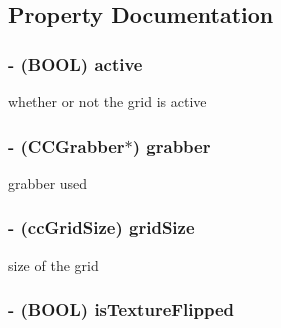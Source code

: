 \subsection{Property Documentation}
\hypertarget{interface_c_c_grid_base_a1ff789adfb6e068f9bdc460c70916035}{
\subsubsection[{active}]{\setlength{\rightskip}{0pt plus 5cm}-\/ (B\-O\-O\-L) {\bf active}}}\label{interface_c_c_grid_base_a1ff789adfb6e068f9bdc460c70916035}
whether or not the grid is active \hypertarget{interface_c_c_grid_base_a9947ff1cac4cf470351da177fc1c4a19}{
\subsubsection[{grabber}]{\setlength{\rightskip}{0pt plus 5cm}-\/ ({\bf C\-C\-Grabber}$\ast$) {\bf grabber}}}\label{interface_c_c_grid_base_a9947ff1cac4cf470351da177fc1c4a19}
grabber used \hypertarget{interface_c_c_grid_base_a3b115a5e6c8321f599ca3693dc20f62c}{
\subsubsection[{grid\-Size}]{\setlength{\rightskip}{0pt plus 5cm}-\/ ({\bf cc\-Grid\-Size}) {\bf grid\-Size}}}\label{interface_c_c_grid_base_a3b115a5e6c8321f599ca3693dc20f62c}
size of the grid \hypertarget{interface_c_c_grid_base_a4793cac52a6a5d3aa6ca947efed75115}{
\subsubsection[{is\-Texture\-Flipped}]{\setlength{\rightskip}{0pt plus 5cm}-\/ (B\-O\-O\-L) {\bf is\-Texture\-Flipped}}}\label{interface_c_c_grid_base_a4793cac52a6a5d3aa6ca947efed75115}
